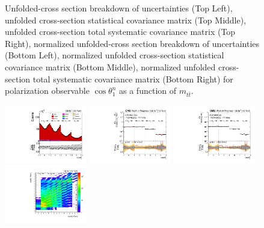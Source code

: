 \begin{figure}[htb]
\begin{center}
\caption{Unfolded-cross section breakdown of uncertainties (Top Left), unfolded cross-section statistical covariance matrix (Top Middle), unfolded cross-section total systematic covariance matrix (Top Right), normalized unfolded-cross section breakdown of uncertainties (Bottom Left), normalized unfolded cross-section statistical covariance matrix (Bottom Middle), normalized unfolded cross-section total systematic covariance matrix (Bottom Right) for polarization observable $\cos\theta_{1}^{n}$ as a function of $m_{t\bar{t}}$.}
\label{fig:b1n_mttbar_uncertainties}
\end{center}
\end{figure}
\clearpage
\begin{figure}[htb]
\begin{center}
 \includegraphics[width=0.32\textwidth]{fig_fullRun2UL/controlplots/combined/Hyp_LeptonBn_vs_TTBarMass.pdf}
 \includegraphics[width=0.32\textwidth]{fig_fullRun2UL/unfolding/combined/UnfoldedResults_b2n_mttbar.pdf}
 \includegraphics[width=0.32\textwidth]{fig_fullRun2UL/unfolding/combined/UnfoldedResultsNorm_b2n_mttbar.pdf} \\
 \includegraphics[width=0.32\textwidth]{fig_fullRun2UL/unfolding/combined/ResponseMatrix_b2n_mttbar.pdf}

\end{center}
\end{figure}
